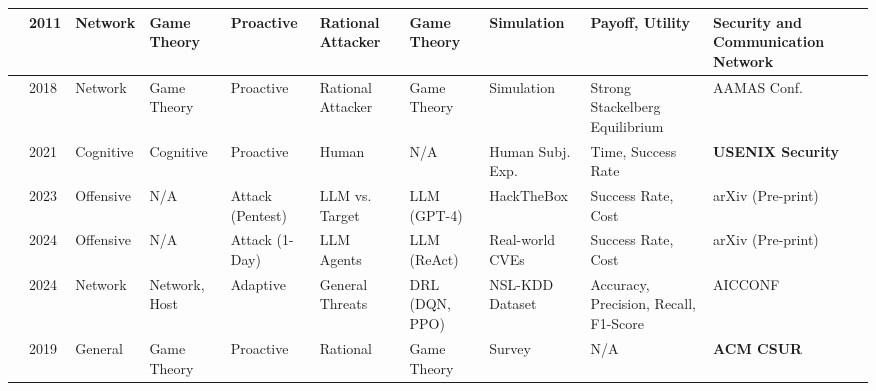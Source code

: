 \begin{landscape}
\begin{longtable}{|p{0.6cm}|p{0.8cm}|p{2.6cm}|p{2.2cm}|p{2.8cm}|p{2.5cm}|p{2cm}|p{2.5cm}|p{2.8cm}|p{3.8cm}|}
            \cite{carroll2011game}        & 2011          & Network                  & Game Theory         & Proactive                     & Rational Attacker           & Game Theory             & Simulation                 & Payoff, Utility                                                  & Security and Communication Network     \\ \hline
            \cite{schlenker2018deceiving} & 2018          & Network                  & Game Theory         & Proactive                     & Rational Attacker           & Game Theory             & Simulation                 & Strong Stackelberg Equilibrium                                   & AAMAS Conf.                            \\ \hline
            \cite{ferguson2021examining}  & 2021          & Cognitive                & Cognitive           & Proactive                     & Human                       & N/A                     & Human Subj. Exp.           & Time, Success Rate                                               & \textbf{USENIX Security}               \\ \hline
            \cite{deng2023pentestgpt}     & 2023          & Offensive                & N/A                 & Attack (Pentest)              & LLM vs. Target              & LLM (GPT-4)             & HackTheBox                 & Success Rate, Cost                                               & arXiv (Pre-print)                      \\ \hline
            \cite{fang2024llm}            & 2024          & Offensive                & N/A                 & Attack (1-Day)                & LLM Agents                  & LLM (ReAct)             & Real-world CVEs            & Success Rate, Cost                                               & arXiv (Pre-print)                      \\ \hline
            \cite{hammad2024deep}         & 2024          & Network                  & Network, Host       & Adaptive                      & General Threats             & DRL (DQN, PPO)          & NSL-KDD Dataset            & Accuracy, Precision, Recall, F1-Score                            & AICCONF                                \\ \hline
            \cite{pawlick2019game}        & 2019          & General                  & Game Theory         & Proactive                     & Rational                    & Game Theory             & Survey                     & N/A                                                              & \textbf{ACM CSUR}                      \\ \hline

\end{longtable}
\end{landscape}
